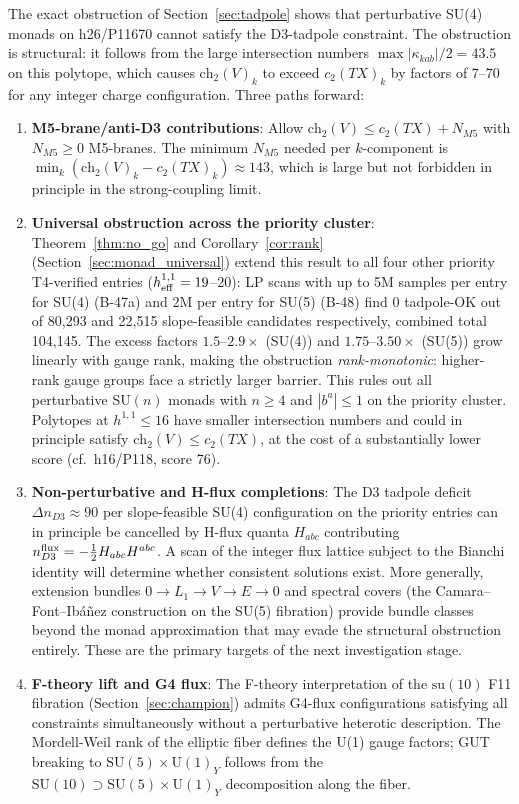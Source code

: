 \documentclass[11pt,a4paper]{article}
\newcommand{\hone}{h^{1,1}}
\newcommand{\ch}{\mathrm{ch}}
\begin{document}
The exact obstruction of Section~\ref{sec:tadpole} shows that
perturbative SU(4) monads on h26/P11670 cannot satisfy the
D3-tadpole constraint.
The obstruction is structural: it follows from the large intersection
numbers $\max|\kappa_{kab}|/2 = 43.5$ on this polytope,
which causes $\ch_2(V)_k$ to exceed $c_2(TX)_k$ by factors
of 7--70 for any integer charge configuration.
Three paths forward:
\begin{enumerate}[noitemsep]
  \item \textbf{M5-brane/anti-D3 contributions}: Allow
    $\ch_2(V) \leq c_2(TX) + N_{M5}$ with $N_{M5}\geq 0$
    M5-branes.  The minimum $N_{M5}$ needed per $k$-component
    is $\min_k(\ch_2(V)_k - c_2(TX)_k) \approx 143$,
    which is large but not forbidden in principle
    in the strong-coupling limit.
  \item \textbf{Universal obstruction across the priority cluster}:
    Theorem~\ref{thm:no_go} and
    Corollary~\ref{cor:rank} (Section~\ref{sec:monad_universal})
    extend this result to all four other priority T4-verified entries
    ($\hone_{\rm eff}=19$--20):
    LP scans with up to 5M samples per entry for SU(4) (B-47a)
    and 2M per entry for SU(5) (B-48) find 0 tadpole-OK out of
    80{,}293 and 22{,}515 slope-feasible candidates respectively,
    combined total 104{,}145.
    The excess factors $1.5$--$2.9\times$ (SU(4)) and
    $1.75$--$3.50\times$ (SU(5)) grow linearly with gauge rank,
    making the obstruction \emph{rank-monotonic}:
    higher-rank gauge groups face a strictly larger barrier.
    This rules out all perturbative SU$(n)$ monads with $n\geq 4$
    and $|b^a|\leq 1$ on the priority cluster.
    Polytopes at $h^{1,1}\leq 16$ have smaller intersection numbers
    and could in principle satisfy $\ch_2(V)\leq c_2(TX)$,
    at the cost of a substantially lower score (cf.\ h16/P118, score 76).
  \item \textbf{Non-perturbative and H-flux completions}:
    The D3 tadpole deficit $\Delta n_{D3}\approx 90$ per slope-feasible
    SU(4) configuration on the priority entries can in principle be
    cancelled by H-flux quanta $H_{abc}$ contributing
    $n_{D3}^{\rm flux} = -\tfrac{1}{2}H_{abc}H^{abc}$.
    A scan of the integer flux lattice subject to the Bianchi identity
    will determine whether consistent solutions exist.
    More generally, extension bundles $0\to L_1\to V\to E\to 0$
    and spectral covers (the Camara--Font--Ib\'a\~nez construction
    on the SU(5) fibration) provide bundle classes beyond the monad
    approximation that may evade the structural obstruction entirely.
    These are the primary targets of the next investigation stage.
  \item \textbf{F-theory lift and G4 flux}: The F-theory
    interpretation of the $\mathrm{su}(10)$ F11 fibration
    (Section~\ref{sec:champion}) admits G4-flux configurations
    satisfying all constraints simultaneously without a
    perturbative heterotic description.
    The Mordell-Weil rank of the elliptic fiber defines the
    U(1) gauge factors; GUT breaking to $\mathrm{SU}(5)\times\mathrm{U}(1)_Y$
    follows from the $\mathrm{SU}(10)\supset\mathrm{SU}(5)\times\mathrm{U}(1)_Y$
    decomposition along the fiber.
\end{enumerate}
\end{document}
